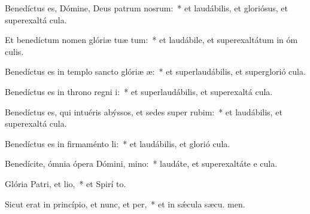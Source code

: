 \item Benedíctus es, Dómine, Deus patrum nosrum:~* et laudábilis, et gloriósus, et superexaltá  cula.

\item Et benedíctum nomen glóriæ tuæ tum:~* et laudábile, et superexaltátum in óm culis.

\item Benedíctus es in templo sancto glóriæ æ:~* et superlaudábilis, et superglorió  cula.

\item Benedíctus es in throno regni i:~* et superlaudábilis, et superexaltá  cula.

\item Benedíctus es, qui intuéris abýssos, et sedes super rubim:~* et laudábilis, et superexaltá  cula.

\item Benedíctus es in firmaménto li:~* et laudábilis, et glorió  cula.

\item Benedícite, ómnia ópera Dómini, mino:~* laudáte, et superexaltáte e  cula.

\item Glória Patri, et lio,~* et Spirí to.

\item Sicut erat in princípio, et nunc, et per,~* et in sǽcula sæcu. men.